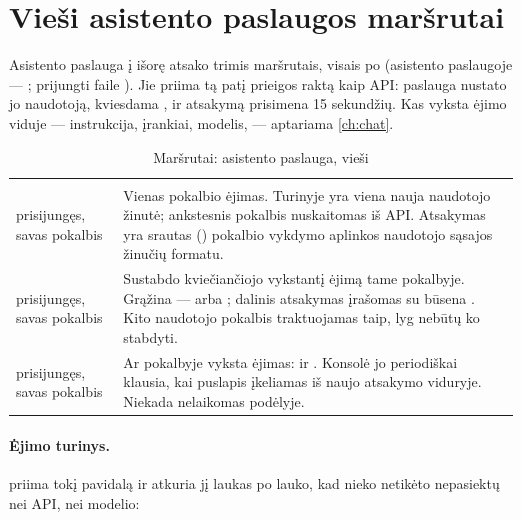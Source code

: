 \section{Vieši asistento paslaugos maršrutai}\label{sec:api:assistant}

Asistento paslauga į išorę atsako trimis maršrutais, visais po 
(asistento paslaugoje --- ; prijungti faile ). Jie priima tą
patį prieigos raktą kaip API: paslauga nustato jo naudotoją, kviesdama , ir
atsakymą prisimena 15 sekundžių. Kas vyksta ėjimo viduje --- instrukcija, įrankiai, modelis, ---
aptariama \cref{ch:chat}.

\begin{xltabular}{\textwidth}{@{}L{19mm}Y@{}}
\caption{Maršrutai: asistento paslauga, vieši}\label{tab:api:assistant}\\
\toprule {} &  \\ \midrule \endfirsthead
\toprule {} &  \\ \midrule \endhead
\bottomrule \endlastfoot
{}
prisijungęs, savas pokalbis & Vienas pokalbio ėjimas. Turinyje yra viena nauja naudotojo žinutė;
  ankstesnis pokalbis nuskaitomas iš API. Atsakymas yra srautas ()
  pokalbio vykdymo aplinkos naudotojo sąsajos žinučių formatu. \\
\addlinespace
{}
prisijungęs, savas pokalbis & Sustabdo kviečiančiojo vykstantį ėjimą tame pokalbyje. Grąžina
   ---  arba ; dalinis atsakymas įrašomas su būsena
  . Kito naudotojo pokalbis traktuojamas taip, lyg nebūtų ko stabdyti. \\
\addlinespace
{}
prisijungęs, savas pokalbis & Ar pokalbyje vyksta ėjimas:  ir .
  Konsolė jo periodiškai klausia, kai puslapis įkeliamas iš naujo atsakymo viduryje. Niekada
  nelaikomas podėlyje. \\
\end{xltabular}

\paragraph{Ėjimo turinys.}  priima tokį pavidalą ir atkuria jį laukas po
lauko, kad nieko netikėto nepasiektų nei API, nei modelio:

